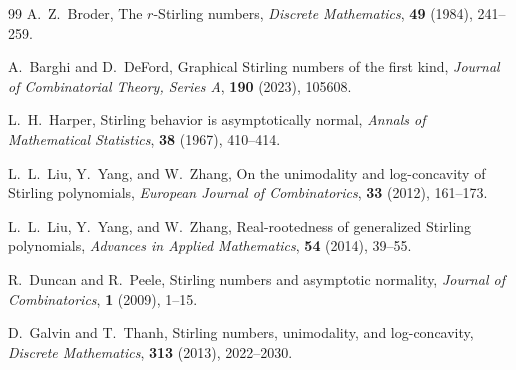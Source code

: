 \documentclass{amsart}
\theoremstyle{definition}
\begin{document}
\begin{thebibliography}{99}
A.~Z.~Broder,
\newblock The $r$-Stirling numbers,
\newblock \emph{Discrete Mathematics}, \textbf{49} (1984), 241--259.

A.~Barghi and D.~DeFord,
\newblock Graphical Stirling numbers of the first kind,
\newblock \emph{Journal of Combinatorial Theory, Series A}, \textbf{190} (2023),
105608.

L.~H.~Harper,
\newblock Stirling behavior is asymptotically normal,
\newblock \emph{Annals of Mathematical Statistics}, \textbf{38} (1967), 410--414.

L.~L.~Liu, Y.~Yang, and W.~Zhang,
\newblock On the unimodality and log-concavity of Stirling polynomials,
\newblock \emph{European Journal of Combinatorics}, \textbf{33} (2012), 161--173.

L.~L.~Liu, Y.~Yang, and W.~Zhang,
\newblock Real-rootedness of generalized Stirling polynomials,
\newblock \emph{Advances in Applied Mathematics}, \textbf{54} (2014), 39--55.

R.~Duncan and R.~Peele,
\newblock Stirling numbers and asymptotic normality,
\newblock \emph{Journal of Combinatorics}, \textbf{1} (2009), 1--15.

D.~Galvin and T.~Thanh,
\newblock Stirling numbers, unimodality, and log-concavity,
\newblock \emph{Discrete Mathematics}, \textbf{313} (2013), 2022--2030.

\end{thebibliography}
\end{document}
